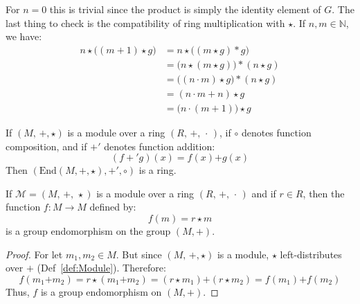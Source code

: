     For $n=0$ this is trivial since the product is simply the identity element
    of $G$. The last thing to check is the compatibility of ring multiplication
    with $\star$. If $n,m\in\mathbb{N}$, we have:
    \begin{subequations}
        \begin{align}
            n\star\big((m+1)\star{g}\big)
            &=n\star\big((m\star{g})*g\big)\\
            &=\big(n\star(m\star{g})\big)*(n\star{g})\\
            &=\big((n\cdot{m})\star{g}\big)*(n\star{g})\\
            &=(n\cdot{m}+n)\star{g}\\
            &=\big(n\cdot(m+1)\big)\star{g}
        \end{align}
    \end{subequations}
    \begin{theorem}
        If $(M,\,\boldsymbol{+},\star)$ is a module over a ring
        $(R,\,+,\,\cdot\,)$, if $\circ$ denotes function composition,
        and if $\boldsymbol{+}'$ denotes function addition:
        \begin{equation}
            (f+'g)(x)=f(x)\boldsymbol{+}g(x)
        \end{equation}
        Then $(\textrm{End}(M,\boldsymbol{+},\star),\boldsymbol{+}',\circ)$
        is a ring.
    \end{theorem}
    \begin{theorem}
        \label{thm:Scalar_Mult_in_Module_Defines_Group_Endo}%
        If $\mathcal{M}=(M,\,\boldsymbol{+},\,\star)$ is a module over a ring
        $(R,\,+,\,\cdot\,)$ and if $r\in{R}$, then the function
        $f:M\rightarrow{M}$ defined by:
        \begin{equation}
            f(m)=r\star{m}
        \end{equation}
        is a group endomorphism on the group $(M,\boldsymbol{+})$.
    \end{theorem}
    \begin{proof}
        For let $m_{1},m_{2}\in{M}$. But since $(M,\,\boldsymbol{+},\star)$
        is a module, $\star$ left-distributes over $\boldsymbol{+}$
        (Def~\ref{def:Module}). Therefore:
        \begin{equation}
            f(m_{1}\boldsymbol{+}m_{2})
            =r\star(m_{1}\boldsymbol{+}m_{2})
            =(r\star{m}_{1})\boldsymbol{+}(r\star{m}_{2})
            =f(m_{1})\boldsymbol{+}f(m_{2})
        \end{equation}
        Thus, $f$ is a group endomorphism on $(M,\boldsymbol{+})$.
    \end{proof}
